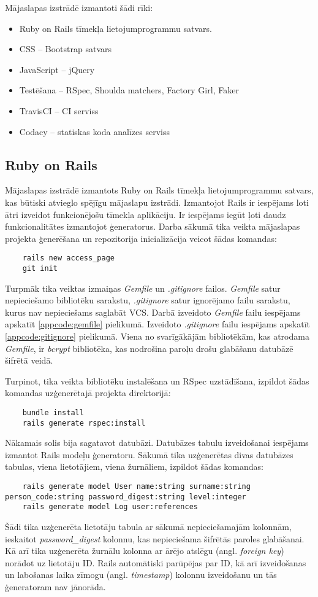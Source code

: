 Mājaslapas izstrādē izmantoti šādi rīki:
\begin{itemize}
	\item Ruby on Rails tīmekļa lietojumprogrammu satvars.
	\item CSS -- Bootstrap satvars
	\item JavaScript -- jQuery
	\item Testēšana -- RSpec, Shoulda matchers, Factory Girl, Faker
	\item TravisCI -- CI serviss
	\item Codacy -- statiskas koda analīzes serviss
\end{itemize}

\subsection{Ruby on Rails}
Mājaslapas izstrādē izmantots Ruby on Rails tīmekļa lietojumprogrammu satvars, kas būtiski atvieglo spējīgu mājaslapu izstrādi.
Izmantojot Rails ir iespējams loti ātri izveidot funkcionējošu tīmekļa aplikāciju. Ir iespējams iegūt ļoti daudz funkcionalitātes izmantojot ģeneratorus.
Darba sākumā tika veikta mājaslapas projekta ģenerēšana un repozitorija inicializācija veicot šādas komandas:
\begin{lstlisting}
	rails new access_page
	git init
\end{lstlisting}

Turpmāk tika veiktas izmaiņas \textit{Gemfile} un \textit{.gitignore} failos. \textit{Gemfile} satur nepieciešamo bibliotēku sarakstu, \textit{.gitignore} satur ignorējamo failu sarakstu, kurus nav nepieciešams saglabāt VCS.
Darbā izveidoto \textit{Gemfile} failu iespējams apskatīt \ref{appcode:gemfile} pielikumā. Izveidoto \textit{.gitignore} failu iespējams apskatīt \ref{appcode:gitignore} pielikumā.
Viena no svarīgākājām bibliotēkām, kas atrodama \textit{Gemfile}, ir \textit{bcrypt} bibliotēka, kas nodrošina paroļu drošu glabāšanu datubāzē šifrētā veidā.

Turpinot, tika veikta bibliotēku instalēšana un RSpec uzstādīšana, izpildot šādas komandas uzģenerētajā projekta direktorijā:
\begin{lstlisting}
	bundle install
	rails generate rspec:install
\end{lstlisting}

Nākamais solis bija sagatavot datubāzi. Datubāzes tabulu izveidošanai iespējams izmantot Rails modeļu ģeneratoru. Sākumā tika uzģenerētas divas datubāzes tabulas, viena lietotājiem, viena žurnāliem, izpildot šādas komandas:
\begin{lstlisting}
	rails generate model User name:string surname:string person_code:string password_digest:string level:integer
	rails generate model Log user:references
\end{lstlisting}
Šādi tika uzģenerēta lietotāju tabula ar sākumā nepieciešamajām kolonnām, ieskaitot \textit{password_digest} kolonnu, kas nepieciešama šifrētās paroles glabāšanai. Kā arī tika uzģenerēta žurnālu kolonna ar ārējo atslēgu (angl. \textit{foreign key}) norādot uz lietotāju ID. Rails automātiski parūpējas par ID, kā arī izveidošanas un labošanas laika zīmogu (angl. \textit{timestamp}) kolonnu izveidošanu un tās ģeneratoram nav jānorāda.

